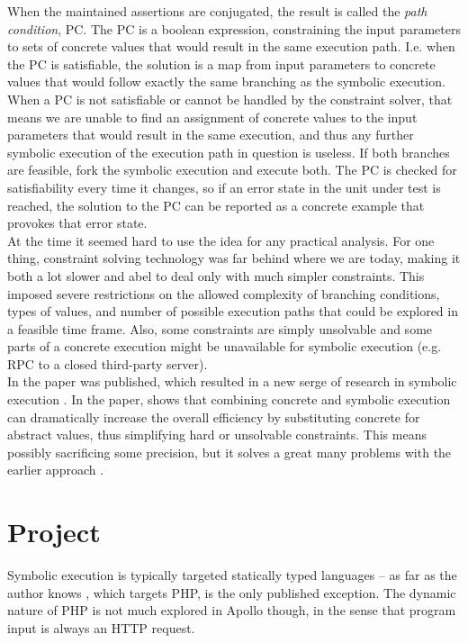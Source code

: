 \documentclass[11pt]{report}
\begin{document}
When the maintained assertions are conjugated, the result is called
the {\it path condition}, PC. The PC is a boolean expression,
constraining the input parameters to sets of concrete values that
would result in the same execution path. I.e. when the PC is
satisfiable, the solution is a map from input parameters to concrete
values that would follow exactly the same branching as the symbolic
execution. When a PC is not satisfiable or cannot be handled by the
constraint solver, that means we are unable to find an assignment of
concrete values to the input parameters that would result in the same
execution, and thus any further symbolic execution of the execution
path in question is useless. If both branches are feasible, fork the
symbolic execution and execute both. The PC is checked for
satisfiability every time it changes, so if an error state in the unit
under test is reached, the solution to the PC can be reported as a
concrete example that provokes that error state. \\

At the time it seemed hard to use the idea for any practical
analysis. For one thing, constraint solving technology was far behind
where we are today, making it both a lot slower and abel to deal only
with much simpler constraints. This imposed severe restrictions on the
allowed complexity of branching conditions, types of values, and
number of possible execution paths that could be explored in a
feasible time frame. Also, some constraints are simply unsolvable and
some parts of a concrete execution might be unavailable for symbolic
execution (e.g. RPC to a closed third-party server). \\

In \citeyear{DART} the paper \cite{DART} was published, which resulted
in a new serge of research in symbolic execution \cite{EXE,CUTE}. In
the paper, \citeauthor*{DART} shows that combining concrete and
symbolic execution can dramatically increase the overall efficiency by
substituting concrete for abstract values, thus simplifying hard or
unsolvable constraints. This means possibly sacrificing some
precision, but it solves a great many problems with the earlier
approach \cite{Cadar:2013}.


\section{Project}

Symbolic execution is typically targeted statically typed languages --
as far as the author knows \cite{Apollo}, which targets PHP, is
the only published exception. The dynamic nature of PHP is not much
explored in Apollo though, in the sense that program input is always
an HTTP request.
\end{document}
